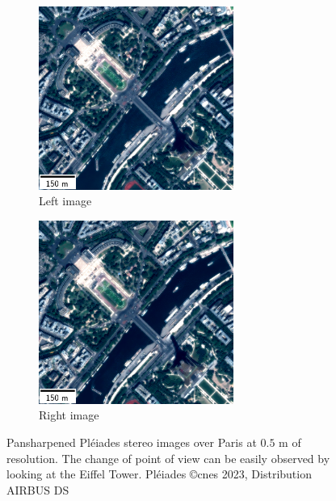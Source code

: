 \begin{figure}
    \centering
    \begin{subfigure}[t]{0.5\linewidth}
        \centering
        \includegraphics[height=6cm]{Images/Chap_1/Paris_Left_stereo.png}
        \caption{Left image}
        \label{fig:Pleiade_over_Paris_a}
    \end{subfigure}\hfill
    \begin{subfigure}[t]{0.5\linewidth}
        \centering
        \includegraphics[height=6cm]{Images/Chap_1/Paris_Right_stereo.png}
        \caption{Right image}
        \label{fig:Pleiade_over_Paris_b}
    \end{subfigure}
    \caption{Pansharpened Pléiades stereo images over Paris at $0.5$ m of resolution. The change of point of view can be easily observed by looking at the Eiffel Tower. Pléiades \copyright \acrshort{cnes} 2023, Distribution AIRBUS DS}
    \label{fig:Pleiade_over_Paris}
\end{figure}

